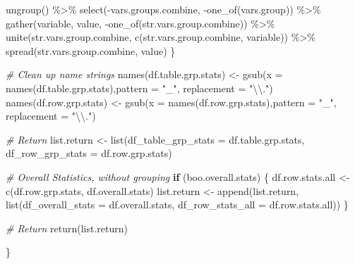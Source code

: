 \documentclass[
]{book}
\newenvironment{Shaded}{\begin{snugshade}}{\end{snugshade}}
\newcommand{\AttributeTok}[1]{\textcolor[rgb]{0.77,0.63,0.00}{#1}}
\newcommand{\CommentTok}[1]{\textcolor[rgb]{0.56,0.35,0.01}{\textit{#1}}}
\newcommand{\ControlFlowTok}[1]{\textcolor[rgb]{0.13,0.29,0.53}{\textbf{#1}}}
\newcommand{\FunctionTok}[1]{\textcolor[rgb]{0.00,0.00,0.00}{#1}}
\newcommand{\NormalTok}[1]{#1}
\newcommand{\OtherTok}[1]{\textcolor[rgb]{0.56,0.35,0.01}{#1}}
\newcommand{\SpecialCharTok}[1]{\textcolor[rgb]{0.00,0.00,0.00}{#1}}
\newcommand{\StringTok}[1]{\textcolor[rgb]{0.31,0.60,0.02}{#1}}
\begin{document}
\begin{Shaded}
\begin{Highlighting}[]
      \FunctionTok{ungroup}\NormalTok{() }\SpecialCharTok{\%\textgreater{}\%}
      \FunctionTok{select}\NormalTok{(}\SpecialCharTok{{-}}\NormalTok{vars.groups.combine, }\SpecialCharTok{{-}}\FunctionTok{one\_of}\NormalTok{(vars.group)) }\SpecialCharTok{\%\textgreater{}\%}
      \FunctionTok{gather}\NormalTok{(variable, value, }\SpecialCharTok{{-}}\FunctionTok{one\_of}\NormalTok{(str.vars.group.combine)) }\SpecialCharTok{\%\textgreater{}\%}
      \FunctionTok{unite}\NormalTok{(str.vars.group.combine, }\FunctionTok{c}\NormalTok{(str.vars.group.combine, }\StringTok{\textquotesingle{}variable\textquotesingle{}}\NormalTok{)) }\SpecialCharTok{\%\textgreater{}\%}
      \FunctionTok{spread}\NormalTok{(str.vars.group.combine, value)}
\NormalTok{  \}}
  
  \CommentTok{\# Clean up name strings}
  \FunctionTok{names}\NormalTok{(df.table.grp.stats) }\OtherTok{\textless{}{-}} 
    \FunctionTok{gsub}\NormalTok{(}\AttributeTok{x =} \FunctionTok{names}\NormalTok{(df.table.grp.stats),}\AttributeTok{pattern =} \StringTok{"\_"}\NormalTok{, }\AttributeTok{replacement =} \StringTok{"}\SpecialCharTok{\textbackslash{}\textbackslash{}}\StringTok{."}\NormalTok{)}
  \FunctionTok{names}\NormalTok{(df.row.grp.stats) }\OtherTok{\textless{}{-}} 
    \FunctionTok{gsub}\NormalTok{(}\AttributeTok{x =} \FunctionTok{names}\NormalTok{(df.row.grp.stats),}\AttributeTok{pattern =} \StringTok{"\_"}\NormalTok{, }\AttributeTok{replacement =} \StringTok{"}\SpecialCharTok{\textbackslash{}\textbackslash{}}\StringTok{."}\NormalTok{)}
  
  \CommentTok{\# Return}
\NormalTok{  list.return }\OtherTok{\textless{}{-}} 
    \FunctionTok{list}\NormalTok{(}\AttributeTok{df\_table\_grp\_stats =}\NormalTok{ df.table.grp.stats, }
         \AttributeTok{df\_row\_grp\_stats =}\NormalTok{ df.row.grp.stats)}
  
  \CommentTok{\# Overall Statistics, without grouping}
  \ControlFlowTok{if}\NormalTok{ (boo.overall.stats) \{}
\NormalTok{    df.row.stats.all }\OtherTok{\textless{}{-}} \FunctionTok{c}\NormalTok{(df.row.grp.stats, df.overall.stats)}
\NormalTok{    list.return }\OtherTok{\textless{}{-}} \FunctionTok{append}\NormalTok{(list.return, }
                          \FunctionTok{list}\NormalTok{(}\AttributeTok{df\_overall\_stats =}\NormalTok{ df.overall.stats,}
                               \AttributeTok{df\_row\_stats\_all =}\NormalTok{ df.row.stats.all))}
\NormalTok{  \}}
  
  \CommentTok{\# Return}
  \FunctionTok{return}\NormalTok{(list.return)}
  
\NormalTok{\}}
\end{Highlighting}
\end{Shaded}
\end{document}
